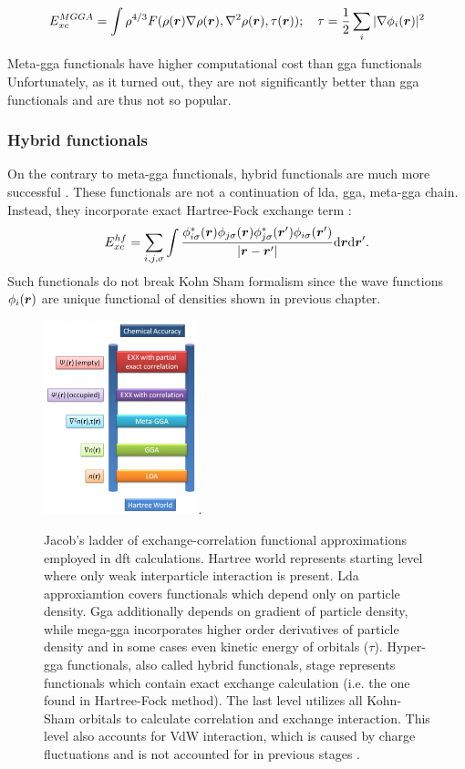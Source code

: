 \documentclass[openany, longbibliography,slovene,a4paper,12pt]{article}
\def\vec#1{\mbox{\boldmath$#1$}}
\newcommand{\dif}{\mathrm{d}}
\begin{document}
\begin{equation}
  E_{xc}^{MGGA}= \int \rho^{4/3}F(\rho(\vec r) \nabla \rho(\vec r), \nabla^2 \rho(\vec r), \tau(\vec r)); \quad \tau=\frac{1}{2}\sum_i |\nabla \phi_i(\vec r)|^2
   \end{equation}

Meta-gga functionals have higher computational cost than gga functionals
Unfortunately, as it turned out, they are not significantly better than gga
functionals and are thus not so popular.


\subsubsection{Hybrid functionals}
On the contrary to meta-gga functionals, hybrid functionals are much more
successful \cite{challenges_den_fun_theor}. These functionals are not a
continuation of lda, gga, meta-gga chain. Instead, they incorporate exact
Hartree-Fock exchange term \cite{challenges_den_fun_theor}:
\begin{equation}
  E^{hf}_{xc}=\sum_ {i,j,\sigma}\int\frac{\phi^*_{i\sigma}(\vec r) \phi_{j\sigma}(\vec r) \phi^*_{j\sigma}(\vec r') \phi_{i\sigma}(\vec r')}{|\vec r - \vec r'|}\dif \vec r \dif \vec r'.
\end{equation}
Such functionals do not break Kohn Sham formalism since the wave functions
$\phi_i(\vec r)$ are unique functional of densities shown in previous chapter.


\begin{figure}[!ht]
  \centering
  \includegraphics[width=0.4\textwidth]{jacobs_functional_ladder_ver2.png}.
  \caption{Jacob’s ladder of exchange-correlation functional approximations
    employed in dft calculations. Hartree world represents starting level where only
    weak interparticle interaction is present. Lda approxiamtion covers
    functionals which depend only on particle density. Gga additionally depends
    on gradient of particle density, while mega-gga incorporates higher order
    derivatives of particle density and in some cases even kinetic energy of
    orbitals ($\tau$). Hyper-gga functionals, also called hybrid functionals,
    stage represents functionals which contain exact exchange calculation (i.e.
    the one found in Hartree-Fock method). The last level utilizes all Kohn-Sham
    orbitals to calculate correlation and exchange interaction. This level also
    accounts for VdW interaction, which is caused by charge fluctuations and is
    not accounted for in previous stages \cite{How_theo_simul_can_address}.
  }
  \label{bijection}
\end{figure}
\end{document}
